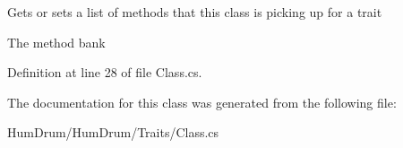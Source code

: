 Gets or sets a list of methods that this class is picking up for a trait 

The method bank

Definition at line 28 of file Class.\+cs.



The documentation for this class was generated from the following file\+:\begin{DoxyCompactItemize}
\item 
Hum\+Drum/\+Hum\+Drum/\+Traits/Class.\+cs\end{DoxyCompactItemize}
